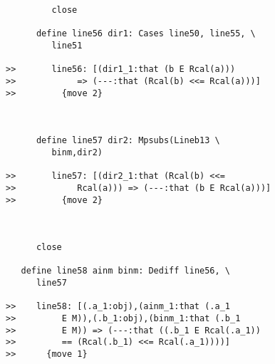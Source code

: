 \documentclass[12pt]{article}
\begin{document}
\begin{verbatim}
         close

      define line56 dir1: Cases line50, line55, \
         line51

>>       line56: [(dir1_1:that (b E Rcal(a)))
>>            => (---:that (Rcal(b) <<= Rcal(a)))]
>>         {move 2}



      define line57 dir2: Mpsubs(Lineb13 \
         binm,dir2)

>>       line57: [(dir2_1:that (Rcal(b) <<=
>>            Rcal(a))) => (---:that (b E Rcal(a)))]
>>         {move 2}



      close

   define line58 ainm binm: Dediff line56, \
      line57

>>    line58: [(.a_1:obj),(ainm_1:that (.a_1
>>         E M)),(.b_1:obj),(binm_1:that (.b_1
>>         E M)) => (---:that ((.b_1 E Rcal(.a_1))
>>         == (Rcal(.b_1) <<= Rcal(.a_1))))]
>>      {move 1}


\end{verbatim}
\end{document}
